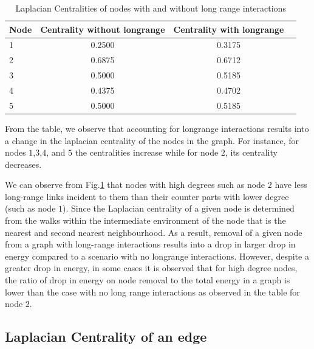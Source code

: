 \documentclass[10pt,a4paper]{article}
\begin{document}
\begin{table}[H]
	\centering
	\caption{Laplacian Centralities of nodes with and without long range interactions}
	\begin{tabular}{|l| c|c|c|}
		\hline 
		Node & Centrality without longrange & Centrality with longrange \\
		\hline
		1 & 0.2500 & 0.3175 \\
		2 & 0.6875 & 0.6712  \\
		3 & 0.5000 & 0.5185  \\
		4 & 0.4375 & 0.4702 \\
		5 & 0.5000 & 0.5185 \\
		\hline
	\end{tabular}
	\label{laplacian-longrange}
\end{table}
From the table, we observe that accounting for longrange interactions results into a change in the laplacian centrality of the nodes in the graph. For instance, for nodes $1$,$3$,$4$, and $5$ the centralities increase while for node $2$, its  centrality decreases. 

We can observe from Fig.\ref{laplacian-longrange} that nodes with high degrees such as node $2$ have less long-range links incident to them than their counter parts with lower degree (such as node $1$). Since the Laplacian centrality of a given node is determined from the walks within the intermediate environment of the node that is the nearest and second nearest neighbourhood. As a result, removal of a given node from a graph with long-range interactions results into a drop in larger drop in energy compared to a scenario with no longrange interactions. However, despite a greater drop in energy, in some cases it is observed that for high degree nodes, the ratio of drop in energy on node removal to the total energy in a graph is lower than the case with no long range interactions as observed in the table for node $2$.
\subsection{Laplacian Centrality of an edge}
\end{document}
